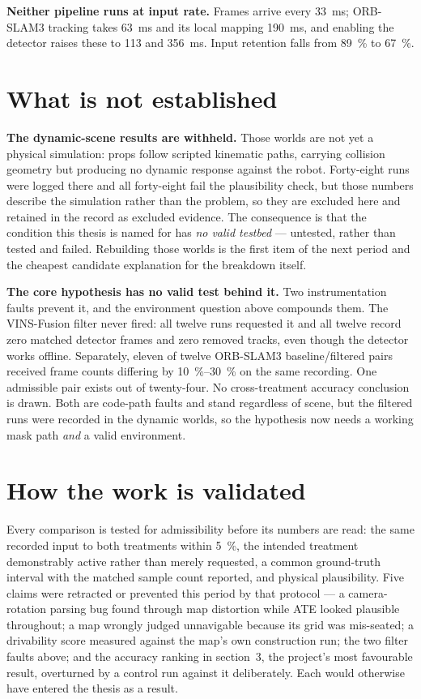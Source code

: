\documentclass[11pt,a4paper]{article}
\begin{document}
\textbf{Neither pipeline runs at input rate.} Frames arrive every
\SI{33}{\milli\second}; ORB-SLAM3 tracking takes \SI{63}{\milli\second} and its
local mapping \SI{190}{\milli\second}, and enabling the detector raises these to
\SI{113}{} and \SI{356}{\milli\second}. Input retention falls from
\SI{89}{\percent} to \SI{67}{\percent}.

\section{What is not established}

\textbf{The dynamic-scene results are withheld.} Those worlds are not yet a
physical simulation: props follow scripted kinematic paths, carrying collision
geometry but producing no dynamic response against the robot. Forty-eight runs
were logged there and all forty-eight fail the plausibility check, but those
numbers describe the simulation rather than the problem, so they are excluded
here and retained in the record as excluded evidence. The consequence is that the
condition this thesis is named for has \emph{no valid testbed} --- untested,
rather than tested and failed. Rebuilding those worlds is the first item of the
next period and the cheapest candidate explanation for the breakdown itself.

\textbf{The core hypothesis has no valid test behind it.} Two instrumentation
faults prevent it, and the environment question above compounds them. The VINS-Fusion filter never fired: all twelve runs requested
it and all twelve record zero matched detector frames and zero removed tracks,
even though the detector works offline. Separately, eleven of twelve ORB-SLAM3
baseline/filtered pairs received frame counts differing by \SIrange{10}{30}{\percent}
on the same recording. One admissible pair exists out of twenty-four. No
cross-treatment accuracy conclusion is drawn. Both are code-path faults and stand
regardless of scene, but the filtered runs were recorded in the dynamic worlds,
so the hypothesis now needs a working mask path \emph{and} a valid environment.

\section{How the work is validated}

Every comparison is tested for admissibility before its numbers are read: the
same recorded input to both treatments within \SI{5}{\percent}, the intended
treatment demonstrably active rather than merely requested, a common
ground-truth interval with the matched sample count reported, and physical
plausibility. Five claims were retracted or prevented this period by that
protocol --- a camera-rotation parsing bug found through map distortion while ATE
looked plausible throughout; a map wrongly judged unnavigable because its grid
was mis-seated; a drivability score measured against the map's own construction
run; the two filter faults above; and the accuracy ranking in section~3, the
project's most favourable result, overturned by a control run against it
deliberately. Each would otherwise have entered the thesis as a result.
\end{document}
